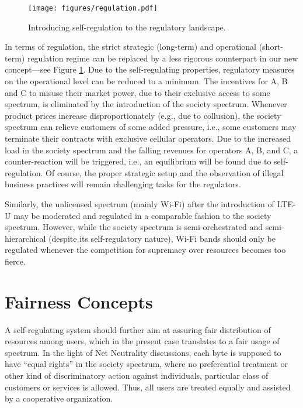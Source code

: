 \documentclass[conference]{IEEEtran}
\begin{document}
\begin{figure}[htbp]
\centering
\texttt{[image: figures/regulation.pdf]}
\caption{Introducing self-regulation to the regulatory landscape.}
\label{fig:regulation}
\end{figure}



In terms of regulation, the strict strategic (long-term) and operational (short-term) regulation regime can be replaced by a less rigorous counterpart in our new concept---see Figure \ref{fig:regulation}. Due to the self-regulating properties, regulatory measures on the operational level can be reduced to a minimum. The incentives for A, B and C to misuse their market power, due to their exclusive access to some spectrum, is eliminated by the introduction of the society spectrum. Whenever product prices increase disproportionately (e.g., due to collusion), the society spectrum can relieve customers of some added pressure, i.e., some customers may terminate their contracts with exclusive cellular operators. Due to the increased load in the society spectrum and the falling revenues for operators A, B, and C, a counter-reaction will be triggered, i.e., an equilibrium will be found due to self-regulation. Of course, the proper strategic setup and the observation of illegal business practices will remain challenging tasks for the regulators.

Similarly, the unlicensed spectrum (mainly Wi-Fi) after the introduction of LTE-U may be moderated and regulated in a comparable fashion to the society spectrum. However, while the society spectrum is semi-orchestrated and semi-hierarchical (despite its self-regulatory nature), Wi-Fi bands should only be regulated whenever the competition for supremacy over resources becomes too fierce.

\section{Fairness Concepts} \label{sec:fairness}

A self-regulating system should further aim at assuring fair distribution of resources among users, which in the present case translates to a fair usage of spectrum. In the light of Net Neutrality discussions, each byte is supposed to have ``equal rights'' in the society spectrum, where no preferential treatment or other kind of discriminatory action against individuals, particular class of customers or services is allowed. Thus, all users are treated equally and assisted by a cooperative organization.
\end{document}
